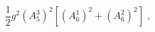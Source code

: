 \begin{equation}
\label{commutator}
\frac{1}{2}g^2 (A_5^3)^2 \left[(A_6^1)^2+ (A_6^2)^2\right] \;,
\end{equation}

